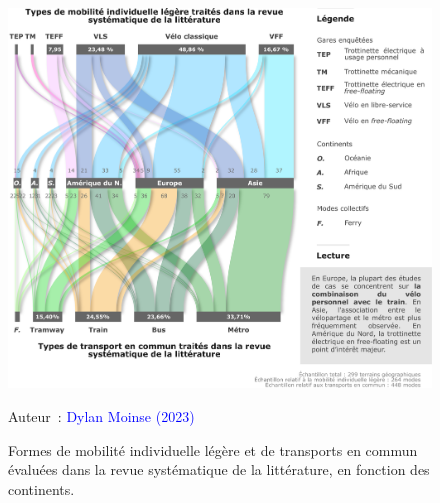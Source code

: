\begin{refsegment}
    \begin{figure}[h!]\vspace*{4pt}
        \caption{Formes de mobilité individuelle légère et de transports en commun évaluées dans la revue systématique de la littérature, en fonction des continents.}
        \label{fig-chap2:MIL-TC-continents}
        \centerline{\includegraphics[width=1\columnwidth]{src/Figures/Chap-2/FR_RSL_MIL_TC_Continents.pdf}}
        \vspace{5pt}
        \begin{flushright}\scriptsize{
        Auteur~: \textcolor{blue}{Dylan Moinse (2023)}
        }\end{flushright}
    \end{figure}
    

\end{refsegment}
